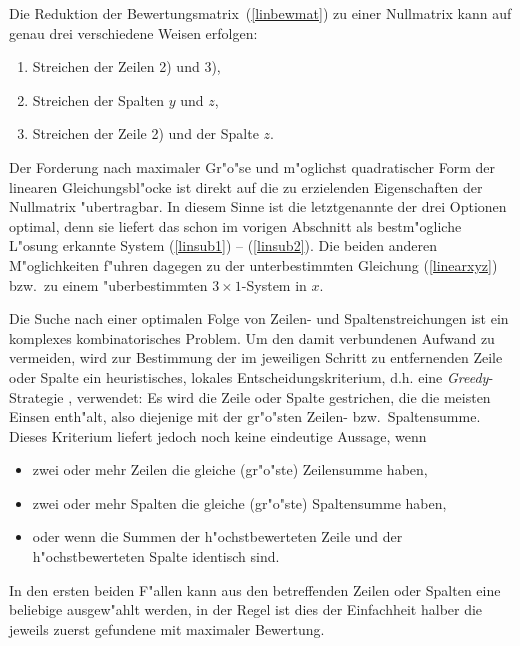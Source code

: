 Die Reduktion der Bewertungsmatrix~(\ref{linbewmat}) zu einer Nullmatrix 
kann auf genau drei verschiedene Weisen erfolgen:
\begin{enumerate}
\item Streichen der Zeilen 2) und 3),
\item Streichen der Spalten $y$ und $z$,
\item Streichen der Zeile 2) und der Spalte $z$.
\end{enumerate}
Der Forderung nach maximaler Gr"o"se und m"oglichst quadratischer Form 
der linearen Gleichungsbl"ocke ist direkt auf die zu erzielenden
Eigenschaften der Nullmatrix "ubertragbar. In diesem Sinne ist die 
letztgenannte der drei Optionen optimal, denn sie liefert das schon im
vorigen Abschnitt als bestm"ogliche L"osung erkannte System 
(\ref{linsub1}) -- (\ref{linsub2}). Die beiden anderen M"oglichkeiten 
f"uhren dagegen zu der unterbestimmten Gleichung (\ref{linearxyz}) bzw.\
zu einem "uberbestimmten $3 \times 1$-System in $x$.

Die Suche nach einer optimalen Folge von Zeilen- und 
Spaltenstreichungen ist ein komplexes kombinatorisches Problem. Um den 
damit verbundenen Aufwand zu vermeiden, wird zur Bestimmung der im 
jeweiligen Schritt zu entfernenden Zeile oder Spalte ein heuristisches,
lokales Entscheidungskriterium, d.h. eine {\em Greedy}-Strategie 
\cite{Foulds}, verwendet: Es wird die Zeile oder Spalte gestrichen, die 
die meisten Einsen enth"alt, also diejenige mit der gr"o"sten Zeilen- 
bzw.\ Spaltensumme. Dieses Kriterium liefert jedoch noch keine 
eindeutige Aussage, wenn
\begin{itemize}
\item zwei oder mehr Zeilen die gleiche (gr"o"ste) Zeilensumme 
haben,
\item zwei oder mehr Spalten die gleiche (gr"o"ste) Spaltensumme 
haben,
\item oder wenn die Summen der h"ochstbewerteten Zeile und der
h"ochstbewerteten Spalte identisch sind.
\end{itemize}
In den ersten beiden F"allen kann aus den betreffenden Zeilen oder 
Spalten eine beliebige ausgew"ahlt werden, in der Regel ist
dies der Einfachheit halber die jeweils zuerst gefundene mit maximaler
Bewertung. 

